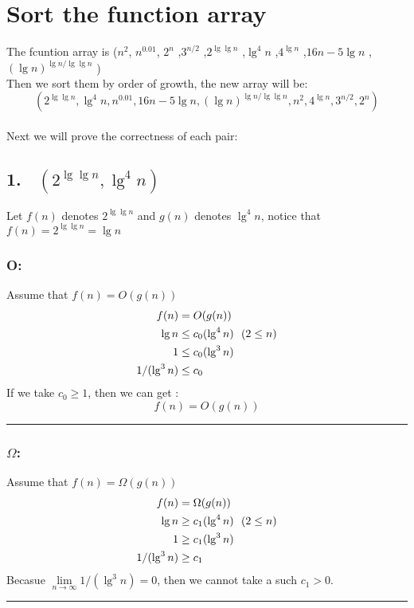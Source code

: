 \documentclass[oneside]{homework} %
\begin{document}
\maketitle
\newpage
\section{Sort the function array}
\noindent The fcuntion array is ($n^2$, $n^{0.01}$, $2^n$ ,$3^{n/2}$ ,$2^{\lg \lg n}$ ,$\lg ^4 n$ ,$4^{\lg n}$ ,$16n-5 \lg n$ ,$(\lg n)^{\lg n / \lg \lg n}$ )
\\ Then we sort them by order of growth, the new array will be:$$(2^{\lg \lg n},\lg ^4 n,n^{0.01},16n-5 \lg n,(\lg n)^{\lg n / \lg \lg n} ,n^2,4^{\lg n},3^{n/2},2^n)$$
\\ Next we will prove the correctness of each pair:
\subsection*{1. ~$(2^{\lg \lg n},\lg ^4 n)$}
Let $f(n)$ denotes $2^{\lg \lg n}$ and $g(n)$ denotes $\lg ^4 n$, notice that $f(n)=2^{\lg \lg n}= \lg n$
\subsubsection* {O:}
Assume that $f(n) = O(g(n))$\\
\begin{equation}
\notag
\begin{aligned}[b]
f(n) &= O(g(n)) \\
\lg n & \leq c_{0}(\lg ^4 n)  ~ ~(2\leq n)\\
1 & \leq c_{0}(\lg ^3 n) \\
1 / (\lg ^3 n)  & \leq c_{0} \\
\end{aligned}
\end{equation}
If we take $c_{0} \geq 1$, then we can get :
$$f(n) = O(g(n))$$
\rule{3mm}{3mm}
\subsubsection* {$\Omega$:}
Assume that $f(n) = \Omega (g(n))$\\
\begin{equation}
\notag
\begin{aligned}[b]
f(n) &= \Omega(g(n)) \\
\lg n & \geq c_{1}(\lg ^4 n)  ~ ~(2\leq n)\\
1 & \geq c_{1}(\lg ^3 n) \\
1 / (\lg ^3 n)  & \geq c_{1} \\
\end{aligned}
\end{equation}
Becasue $\lim\limits_{n\to\infty}{1 / (\lg ^3 n)}  = 0$, then we cannot take a such $c_{1} > 0$.\\
\rule{3mm}{3mm}
\end{document}

